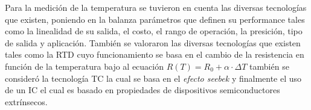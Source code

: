 


Para la medición de la temperatura se tuvieron en cuenta las diversas tecnologías que existen, poniendo en la balanza parámetros que definen su performance tales como la linealidad de su salida, el costo, el rango de operación, la presición, tipo de salida y aplicación.
También se valoraron las diversas tecnologías que existen tales como la RTD cuyo funcionamiento se basa en el cambio de la resistencia en función de la temperatura bajo al ecuación $R(T)=R_0 + \alpha \cdot \Delta T$ también se consideró la tecnología TC la cual se basa en el \textit{efecto seebek} y finalmente el uso de un IC el cual es basado en propiedades de dispositivos semiconductores extrínsecos.

